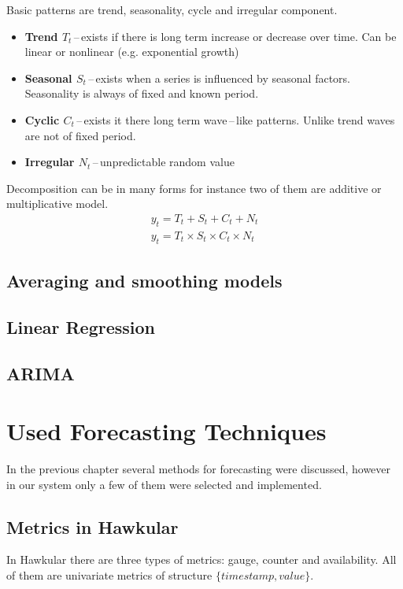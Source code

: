 Basic patterns are trend, seasonality, cycle and irregular component. 

\begin{itemize}
    \item \textbf{Trend $ T_{t} $}\,--\,exists if there is long term increase or decrease over
        time. Can be linear or nonlinear (e.g. exponential growth)
    \item \textbf{Seasonal $ S_{t} $}\,--\,exists when a series is influenced by seasonal factors.
        Seasonality is always of fixed and known period.
    \item \textbf{Cyclic $ C_{t} $}\,--\,exists it there long term wave\,--\,like patterns.
        Unlike trend waves are not of fixed period.
    \item \textbf{Irregular $ N_{t} $}\,--\,unpredictable random value
\end{itemize}

Decomposition can be in many forms for instance two of them are additive or multiplicative model.
\begin{eqnarray}
    y_{t} = T_{t} + S_{t} + C_{t} + N_{t} \\
    y_{t} = T_{t} \times S_{t} \times C_{t} \times N_{t} 
\end{eqnarray}


\section{Averaging and smoothing models}

\section{Linear Regression}

\section{ARIMA}
\chapter{Used Forecasting Techniques}
In the previous chapter several methods for forecasting were discussed, however
in our system only a few of them were selected and implemented.

\section{Metrics in Hawkular}
In Hawkular there are three types of metrics: gauge, counter and availability. 
All of them are univariate metrics of structure $ \{timestamp, value\} $.

